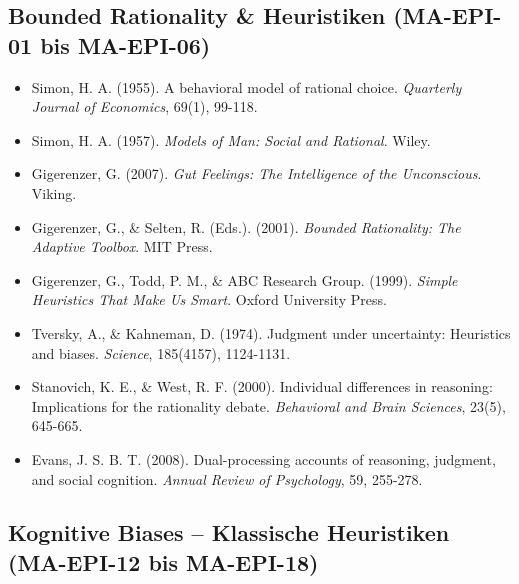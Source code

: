 \subsection*{Bounded Rationality \& Heuristiken (MA-EPI-01 bis MA-EPI-06)}

\begin{itemize}[leftmargin=*]
    \item Simon, H. A. (1955). A behavioral model of rational choice. \textit{Quarterly Journal of Economics}, 69(1), 99-118.
    \item Simon, H. A. (1957). \textit{Models of Man: Social and Rational}. Wiley.
    \item Gigerenzer, G. (2007). \textit{Gut Feelings: The Intelligence of the Unconscious}. Viking.
    \item Gigerenzer, G., \& Selten, R. (Eds.). (2001). \textit{Bounded Rationality: The Adaptive Toolbox}. MIT Press.
    \item Gigerenzer, G., Todd, P. M., \& ABC Research Group. (1999). \textit{Simple Heuristics That Make Us Smart}. Oxford University Press.
    \item Tversky, A., \& Kahneman, D. (1974). Judgment under uncertainty: Heuristics and biases. \textit{Science}, 185(4157), 1124-1131.
    \item Stanovich, K. E., \& West, R. F. (2000). Individual differences in reasoning: Implications for the rationality debate. \textit{Behavioral and Brain Sciences}, 23(5), 645-665.
    \item Evans, J. S. B. T. (2008). Dual-processing accounts of reasoning, judgment, and social cognition. \textit{Annual Review of Psychology}, 59, 255-278.
\end{itemize}

\subsection*{Kognitive Biases -- Klassische Heuristiken (MA-EPI-12 bis MA-EPI-18)}

